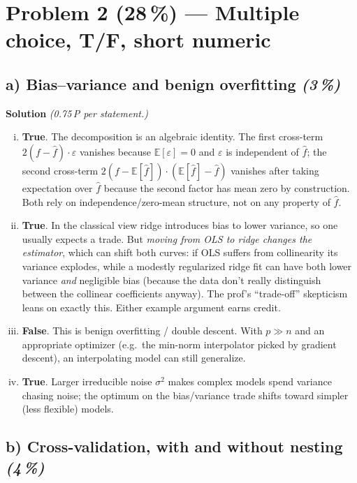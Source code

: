 \documentclass[11pt,a4paper]{article}
\newcommand{\points}[1]{\textbf{(#1\,\%)}}
\newcommand{\subpoints}[1]{\textit{(#1\,\%)}}
\newcommand{\sol}{\noindent\textbf{Solution}}
\begin{document}
\section*{Problem 2 \points{28} --- Multiple choice, T/F, short numeric}

\subsection*{a) Bias--variance and benign overfitting \subpoints{3}}
\sol{} \emph{(0.75\,P per statement.)}
\begin{enumerate}[(i)]
  \item \textbf{True}. The decomposition is an algebraic identity. The first cross-term
        $2(f-\hat f)\cdot\varepsilon$ vanishes because $\mathbb{E}[\varepsilon]=0$ and
        $\varepsilon$ is independent of $\hat f$; the second cross-term
        $2(f-\mathbb{E}[\hat f])\cdot(\mathbb{E}[\hat f]-\hat f)$ vanishes after taking expectation
        over $\hat f$ because the second factor has mean zero by construction. Both rely on
        independence/zero-mean structure, not on any property of $\hat f$.
  \item \textbf{True}. In the classical view ridge introduces bias to lower variance, so one
        usually expects a trade. But \emph{moving from OLS to ridge changes the estimator}, which
        can shift both curves: if OLS suffers from collinearity its variance explodes, while a
        modestly regularized ridge fit can have both lower variance \emph{and} negligible bias
        (because the data don't really distinguish between the collinear coefficients anyway).
        The prof's ``trade-off'' skepticism leans on exactly this. Either example argument earns
        credit.
  \item \textbf{False}. This is benign overfitting / double descent. With $p\gg n$ and an
        appropriate optimizer (e.g.\ the min-norm interpolator picked by gradient descent), an
        interpolating model can still generalize.
  \item \textbf{True}. Larger irreducible noise $\sigma^2$ makes complex models spend variance
        chasing noise; the optimum on the bias/variance trade shifts toward simpler (less
        flexible) models.
\end{enumerate}

\subsection*{b) Cross-validation, with and without nesting \subpoints{4}}
\end{document}
